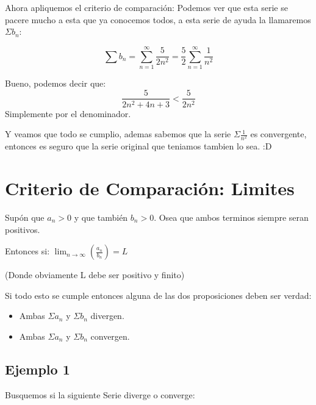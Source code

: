 \documentclass[12pt]{report}                                %
\begin{document}
        Ahora apliquemos el criterio de comparación: Podemos ver que esta serie se pacere mucho a esta
        que ya conocemos todos, a esta serie de ayuda la llamaremos $\Sigma b_n$:

        \begin{equation*}
            \sum b_n = \sum_{n=1}^{\infty} \frac{5}{2n^2} = \frac{5}{2}\sum_{n=1}^{\infty} \frac{1}{n^2}
        \end{equation*}

        Bueno, podemos decir que:
        \begin{equation*}
            \frac{5}{2n^2 +4n +3} < \frac{5}{2n^2}
        \end{equation*}
        Simplemente por el denominador.

        Y veamos que todo se cumplio, ademas sabemos que la serie $\Sigma \frac{1}{n^2}$ es convergente,
        entonces es seguro que la serie original que teniamos tambien lo sea. :D



    \clearpage
    \section{Criterio de Comparación: Limites}

        Supón que $a _n > 0$ y que también $b_n > 0$. Osea que ambos terminos siempre seran positivos.

        Entonces si:
        $\lim_{n \to \infty} \left( \frac{a_n}{b_n} \right) = L$

        (Donde obviamente L debe ser positivo y finito)

        Si todo esto se cumple entonces alguna de las dos proposiciones deben ser verdad:
        \begin{itemize}
            \item Ambas $\Sigma a_n$ y $\Sigma b_n$ divergen.
            \item Ambas $\Sigma a_n$ y $\Sigma b_n$ convergen.
        \end{itemize}

        \subsection{Ejemplo 1}
        Busquemos si la siguiente Serie diverge o converge:
\end{document}
